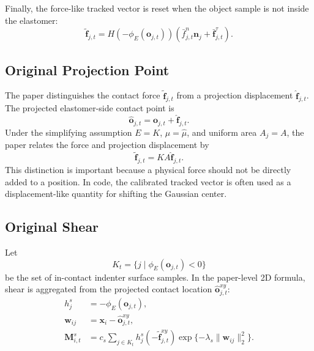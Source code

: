 \documentclass[11pt]{article}
\begin{document}
Finally, the force-like tracked vector is reset when the object sample is not
inside the elastomer:
\begin{equation}
    \tilde{\mathbf{f}}_{j,t}
    =
    H(-\phi_E(\mathbf{o}_{j,t}))
    \left(
        \bar{f}^{n}_{j,t}\mathbf{n}_j
        +
        \bar{\mathbf{f}}^{\tau}_{j,t}
    \right).
    \label{eq:original-tracked-force}
\end{equation}

\subsection{Original Projection Point}

The paper distinguishes the contact force $\tilde{\mathbf{f}}_{j,t}$ from a
projection displacement $\hat{\mathbf{f}}_{j,t}$. The projected elastomer-side
contact point is
\begin{equation}
    \hat{\mathbf{o}}_{j,t}
    =
    \mathbf{o}_{j,t}
    +
    \hat{\mathbf{f}}_{j,t}.
    \label{eq:original-projected-point}
\end{equation}
Under the simplifying assumption $E=K$, $\mu=\hat{\mu}$, and uniform area
$A_j=A$, the paper relates the force and projection displacement by
\begin{equation}
    \tilde{\mathbf{f}}_{j,t}
    =
    KA\hat{\mathbf{f}}_{j,t}.
    \label{eq:force-projection-relation}
\end{equation}
This distinction is important because a physical force should not be directly
added to a position. In code, the calibrated tracked vector is often used as a
displacement-like quantity for shifting the Gaussian center.

\subsection{Original Shear}

Let
\begin{equation}
    K_t
    =
    \{j \mid \phi_E(\mathbf{o}_{j,t})<0\}
\end{equation}
be the set of in-contact indenter surface samples. In the paper-level 2D
formula, shear is aggregated from the projected contact location
$\hat{\mathbf{o}}_{j,t}^{xy}$:
\begin{align}
    h^s_j
    &=
    -\phi_E(\mathbf{o}_{j,t}), \\
    \mathbf{w}_{ij}
    &=
    \mathbf{x}_i-\hat{\mathbf{o}}_{j,t}^{xy}, \\
    \mathbf{M}^{s}_{i,t}
    &=
    c_s
    \sum_{j\in K_t}
    h^s_j
    \left(
        -\tilde{\mathbf{f}}^{xy}_{j,t}
    \right)
    \exp\{-\lambda_s\|\mathbf{w}_{ij}\|_2^2\}.
    \label{eq:original-paper-shear}
\end{align}
\end{document}
